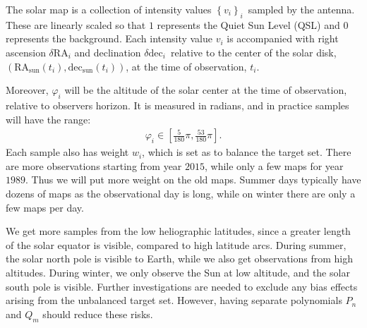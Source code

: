 \documentclass{aa}
\newcommand{\eqnl}[2]{\begin{eqnarray}\label{#1}#2\end{eqnarray}}
\begin{document}
The solar map is a collection of intensity values $\left\{ v_i \right\}_i$ sampled by the antenna. These are linearly scaled so that $1$ represents the Quiet Sun Level (QSL) and $0$ represents the background. Each intensity value 
$v_i$ is accompanied with right ascension $\delta \mathrm{RA}_i$ and declination $\delta 
\mathrm{dec}_i$ relative to the center of the solar disk, $\left( \mathrm{RA}_{\mathrm{sun}}(t_i), 
\mathrm{dec}_{\mathrm{sun}}(t_i) \right)$, at the time of observation, $t_i$.


Moreover, $\varphi_i$ will be the altitude of the solar center at the time of observation, relative 
to observers horizon. It is measured in radians, and in practice samples will have the range:
\eqnl{altitude_range}{
\varphi_i \in \left[ \frac{5}{180} \pi, \frac{53}{180} \pi \right] \text{.}
}
Each sample also has weight $w_i$, which is set as to balance the target set. 
There are more 
observations starting from year $2015$, while only a few maps for year $1989$. 
Thus we will put more weight on the old 
maps. Summer days typically have dozens of maps as the observational day is long, while on winter there are only a few maps per day.

We get more samples from the low heliographic latitudes, since a greater length of the solar equator is visible, 
compared to high latitude arcs. During summer, the solar north pole is visible to Earth, while we also get observations 
from high altitudes. During winter, we only observe the Sun at low altitude, and the solar south pole is visible. 
Further investigations are needed to exclude any bias effects arising from the unbalanced target set. However, having 
separate polynomials $P_n$ and $Q_m$ should reduce these risks. 

\end{document}
